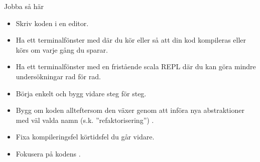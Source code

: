 	\begin{SlideExtra}{Jobba så här}
		\begin{itemize}
			\item Skriv koden i en editor.
			\item Ha ett terminalfönster med  där du kör  eller  så att din kod kompileras eller körs om varje gång du sparar.
			\item Ha ett terminalfönster med en fristående scala REPL där du kan göra mindre undersökningar rad för rad.
			\item Börja enkelt och bygg vidare steg för steg.
			\item Bygg om koden allteftersom den växer genom att införa nya abstraktioner med väl valda namn (s.k. ''refaktorisering'') .
			\item Fixa  kompileringsfel \code{||} körtidsfel  du går vidare.
			\item Fokusera på kodens .
		\end{itemize}

	\end{SlideExtra}

\fi
